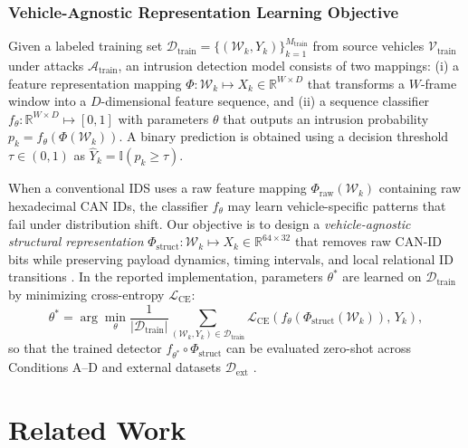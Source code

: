 \documentclass[12pt, a4paper, reqno, oneside]{book}
\begin{document}
\subsection{Vehicle-Agnostic Representation Learning Objective}
Given a labeled training set $\mathcal{D}_{\text{train}} = \{(\mathcal{W}_k, Y_k)\}_{k=1}^{M_{\text{train}}}$ from source vehicles $\mathcal{V}_{\text{train}}$ under attacks $\mathcal{A}_{\text{train}}$, an intrusion detection model consists of two mappings: (i) a feature representation mapping $\Phi: \mathcal{W}_k \mapsto X_k \in \mathbb{R}^{W \times D}$ that transforms a $W$-frame window into a $D$-dimensional feature sequence, and (ii) a sequence classifier $f_{\theta}: \mathbb{R}^{W \times D} \mapsto [0, 1]$ with parameters $\theta$ that outputs an intrusion probability $p_k = f_{\theta}(\Phi(\mathcal{W}_k))$. A binary prediction is obtained using a decision threshold $\tau \in (0, 1)$ as $\hat{Y}_k = \mathbb{I}(p_k \ge \tau)$.

When a conventional IDS uses a raw feature mapping $\Phi_{\text{raw}}(\mathcal{W}_k)$ containing raw hexadecimal CAN IDs, the classifier $f_{\theta}$ may learn vehicle-specific patterns that fail under distribution shift. Our objective is to design a \textit{vehicle-agnostic structural representation} $\Phi_{\text{struct}}: \mathcal{W}_k \mapsto X_k \in \mathbb{R}^{64 \times 32}$ that removes raw CAN-ID bits while preserving payload dynamics, timing intervals, and local relational ID transitions \cite{islam2020graph, meng2023gbids}. In the reported implementation, parameters $\theta^*$ are learned on $\mathcal{D}_{\text{train}}$ by minimizing cross-entropy $\mathcal{L}_{\text{CE}}$:
\begin{equation}
    \theta^* = \arg\min_{\theta} \frac{1}{|\mathcal{D}_{\text{train}}|} \sum_{(\mathcal{W}_k, Y_k) \in \mathcal{D}_{\text{train}}} \mathcal{L}_{\text{CE}}\!\left( f_{\theta}\!\left(\Phi_{\text{struct}}(\mathcal{W}_k)\right),\, Y_k \right),
\end{equation}
so that the trained detector $f_{\theta^*} \circ \Phi_{\text{struct}}$ can be evaluated zero-shot across Conditions A--D and external datasets $\mathcal{D}_{\text{ext}}$ \cite{lee2017otids, dupont2019automotive, rajapaksha2024canmirgu, neto2024ciciov2024}.

\chapter{Related Work}
\label{chap:related}
\end{document}
